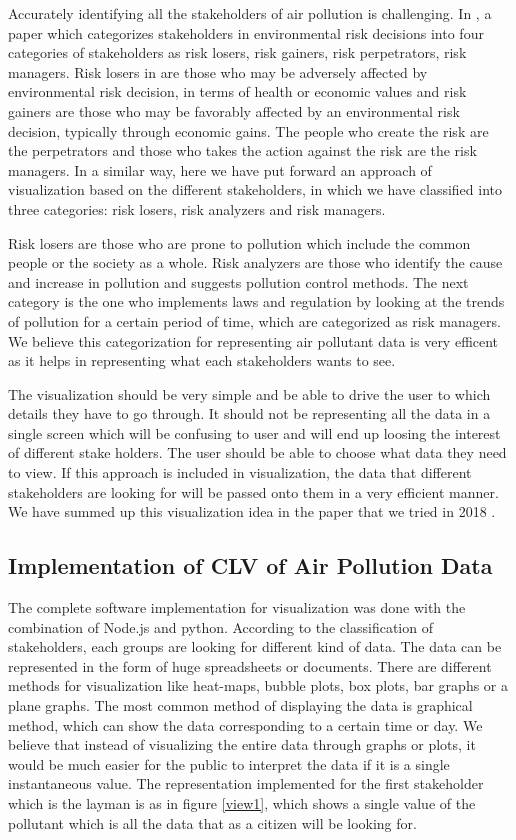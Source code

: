 Accurately identifying all the stakeholders of air pollution is challenging. In \cite{English2000}, a paper which categorizes stakeholders in environmental risk decisions into four categories of stakeholders as risk losers, risk gainers, risk perpetrators, risk managers. 
Risk losers in \cite{English2000} are those who may be adversely affected by environmental risk decision, in terms of health or economic values and risk gainers are those who may be favorably affected by an environmental risk decision, typically through economic gains. The people who create the risk are the perpetrators and those who takes the action against the risk are the risk managers. In a similar way, here we have put forward an approach of visualization based on the different stakeholders, in which we have classified into three categories: risk losers, risk analyzers and risk managers. 

Risk losers are those who are prone to pollution which include the common people or the society as a whole. Risk analyzers are those who identify the cause and increase in pollution and suggests pollution control methods. The next category is the one who implements laws and regulation by looking at the trends of pollution for a certain period of time, which are categorized as risk managers. 
We believe this categorization for representing air pollutant data is very efficent as it helps in representing what each stakeholders wants to see.

The visualization should be very simple and be able to drive the user to which details they have to go through. It should not be representing all the data in a single screen which will be confusing to user and will end up loosing the interest of different stake holders. The user should be able to choose what data they need to view. If this approach is included in visualization, the data that different stakeholders are looking for will be passed onto them in a very efficient manner. We have summed up this visualization idea in the paper that we tried in 2018 \cite{Saju2018(1)}.

\subsection{Implementation of CLV of Air Pollution Data}

The complete software implementation for visualization was done with the combination of Node.js and python.
According to the classification of stakeholders, each groups are looking for different kind of data. The data can be represented in the form of huge spreadsheets or documents. There are different methods for visualization like heat-maps, bubble plots, box plots, bar graphs or a plane graphs. The most common method of displaying the data is graphical method, which can show the data corresponding to a certain time or day. We believe that instead of visualizing the entire data through graphs or plots, it would be much easier for the public to interpret the data if it is a single instantaneous value. The  representation implemented for the first stakeholder which is the layman is as in figure \ref{view1}, which shows a single value of the pollutant which is all the data that as a citizen will be looking for.

